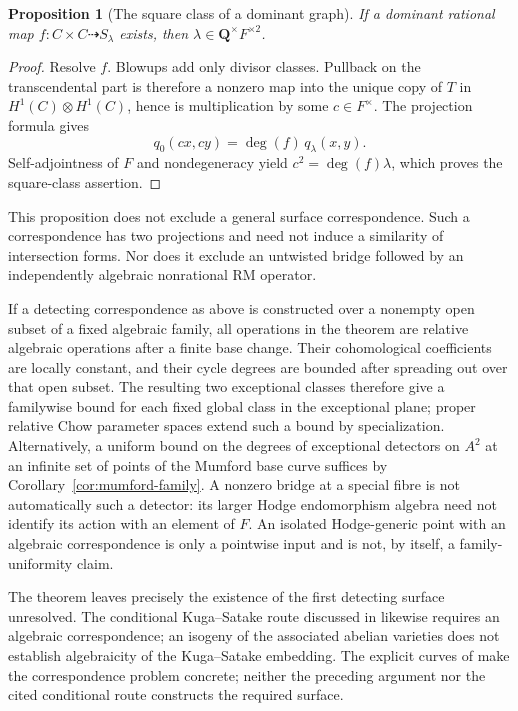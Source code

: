 \documentclass[11pt]{article}
\newtheorem{proposition}[theorem]{Proposition}
\theoremstyle{definition}
\theoremstyle{remark}
\begin{document}
\begin{proposition}[The square class of a dominant graph]\label{prop:mumford-graph-twist}
If a dominant rational map $f:C\times C\dashrightarrow S_\lambda$
exists, then $\lambda\in\mathbf Q^\times F^{\times2}$.
\end{proposition}

\begin{proof}
Resolve $f$.  Blowups add only divisor classes.  Pullback on the
transcendental part is therefore a nonzero map into the unique copy of
$T$ in $H^1(C)\otimes H^1(C)$, hence is multiplication by some
$c\in F^\times$.  The projection formula gives
\[
 q_0(cx,cy)=\deg(f)\,q_\lambda(x,y).
\]
Self-adjointness of $F$ and nondegeneracy yield
$c^2=\deg(f)\lambda$, which proves the square-class assertion.
\end{proof}

This proposition does not exclude a general surface correspondence.
Such a correspondence has two projections and need not induce a
similarity of intersection forms.  Nor does it exclude an untwisted
bridge followed by an independently algebraic nonrational RM operator.

If a detecting correspondence as above is constructed over a nonempty
open subset of a fixed algebraic family, all operations in the theorem
are relative algebraic operations after a finite base change.  Their
cohomological coefficients are locally constant, and their cycle
degrees are bounded after spreading out over that open subset.
The resulting two exceptional classes therefore give a familywise
bound for each fixed global class in the exceptional plane; proper
relative Chow parameter spaces extend such a bound by specialization.
Alternatively, a uniform bound on the degrees of exceptional detectors on $A^2$ at an infinite set of points of the Mumford base curve suffices by Corollary~\ref{cor:mumford-family}. A nonzero bridge at a special fibre is not automatically such a detector: its larger Hodge endomorphism algebra need not identify its action with an element of $F$.
An isolated Hodge-generic point with an algebraic correspondence is
only a pointwise input and is not, by itself, a family-uniformity claim.

The theorem leaves precisely the existence of the first detecting
surface unresolved.  The conditional Kuga--Satake route discussed in \cite[Section~5.2, pp.~24--25]{BHPS} likewise requires an algebraic correspondence; an isogeny of the associated abelian varieties does not establish algebraicity of the Kuga--Satake embedding.  The explicit curves
of \cite{BHPS} make the correspondence problem concrete; neither
the preceding argument nor the cited conditional route constructs the
required surface.
\end{document}
